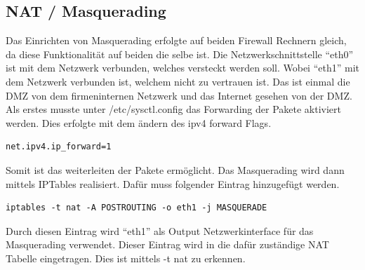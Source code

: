 \subsection{NAT / Masquerading}
Das Einrichten von Masquerading erfolgte auf beiden Firewall Rechnern gleich, da diese Funktionalität auf beiden die selbe ist. Die Netzwerkschnittstelle "`eth0"' ist mit dem Netzwerk verbunden, welches versteckt werden soll. Wobei "`eth1"' mit dem Netzwerk verbunden ist, welchem nicht zu vertrauen ist. Das ist einmal die DMZ von dem firmeninternen Netzwerk und das Internet gesehen von der DMZ. \\
Als erstes musste unter /etc/sysctl.config das Forwarding der Pakete aktiviert werden. Dies erfolgte mit dem ändern des ipv4 forward Flags.
\begin{lstlisting}[caption={/etc/sysctl.config}]
net.ipv4.ip_forward=1
\end{lstlisting}
Somit ist das weiterleiten der Pakete ermöglicht. Das Masquerading wird dann mittels IPTables realisiert. Dafür muss folgender Eintrag hinzugefügt werden.
\begin{lstlisting}
iptables -t nat -A POSTROUTING -o eth1 -j MASQUERADE
\end{lstlisting}
Durch diesen Eintrag wird "`eth1"' als Output Netzwerkinterface für das Masquerading verwendet. Dieser Eintrag wird in die dafür zuständige NAT Tabelle eingetragen. Dies ist mittels -t nat zu erkennen.

